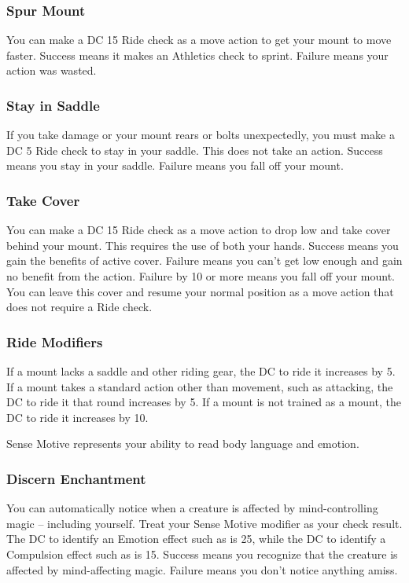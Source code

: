 \subsubsection{Spur Mount}
You can make a DC 15 Ride check as a move action to get your mount to move faster. Success means it makes an Athletics check to sprint. Failure means your action was wasted. 

\subsubsection{Stay in Saddle}
If you take damage or your mount rears or bolts unexpectedly, you must make a DC 5 Ride check to stay in your saddle. This does not take an action. Success means you stay in your saddle. Failure means you fall off your mount.

\subsubsection{Take Cover}
You can make a DC 15 Ride check as a move action to drop low and take cover behind your mount. This requires the use of both your hands. Success means you gain the benefits of active cover. Failure means you can't get low enough and gain no benefit from the action. Failure by 10 or more means you fall off your mount. You can leave this cover and resume your normal position as a move action that does not require a Ride check.

\subsubsection{Ride Modifiers}\label{Ride Modifiers}
If a mount lacks a saddle and other riding gear, the DC to ride it increases by 5. If a mount takes a standard action other than movement, such as attacking, the DC to ride it that round increases by 5. If a mount is not trained as a mount, the DC to ride it increases by 10.

Sense Motive represents your ability to read body language and emotion.

\subsubsection{Discern Enchantment}
You can automatically notice when a creature is affected by mind-controlling magic -- including yourself. Treat your Sense Motive modifier as your check result. The DC to identify an Emotion effect such as  is 25, while the DC to identify a Compulsion effect such as  is 15. Success means you recognize that the creature is affected by mind-affecting magic. Failure means you don't notice anything amiss.

